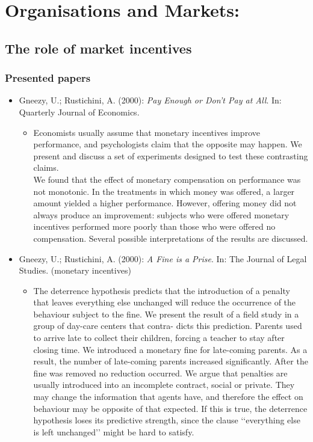 
\chapter{Organisations and Markets:}
\section{The role of market incentives}

\subsection{Presented papers}

\begin{itemize}
	\item Gneezy, U.; Rustichini, A. (2000): \textit{Pay Enough or Don't Pay at All}. In: Quarterly Journal of Economics.
		\begin{itemize}
			\item Economists usually assume that monetary incentives improve performance, and psychologists claim that the opposite may happen. We present and discuss a set of experiments designed to test these contrasting claims. \\
				We found that the effect of monetary compensation on performance was not monotonic. In the treatments in which money was offered, a larger amount yielded a higher performance. However, offering money did not always produce an improvement: subjects who were offered monetary incentives performed more poorly than those who were offered no compensation. Several possible interpretations of the results are discussed.
		\end{itemize}
	\item Gneezy, U.; Rustichini, A. (2000): \textit{A Fine is a Prise}. In: The Journal of Legal Studies. (monetary incentives)
		\begin{itemize}
			\item The deterrence hypothesis predicts that the introduction of a penalty that leaves everything else unchanged will reduce the occurrence of the behaviour subject to the fine. We present the result of a field study in a group of day-care centers that contra- dicts this prediction. Parents used to arrive late to collect their children, forcing a teacher to stay after closing time. We introduced a monetary fine for late-coming parents. As a result, the number of late-coming parents increased significantly. After the fine was removed no reduction occurred. We argue that penalties are usually introduced into an incomplete contract, social or private. They may change the information that agents have, and therefore the effect on behaviour may be opposite of that expected. If this is true, the deterrence hypothesis loses its predictive strength, since the clause ‘‘everything else is left unchanged’’ might be hard to satisfy.

\end{itemize}
\end{itemize}
